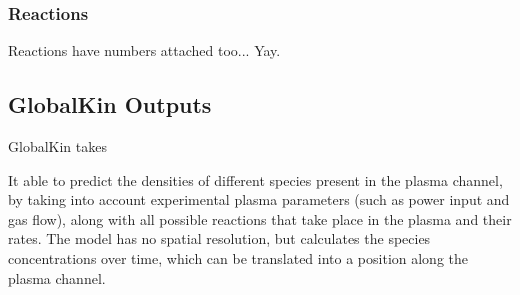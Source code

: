 \documentclass[11pt, oneside]{article}   	%
\begin{document}
\subsubsection{Reactions}
Reactions have numbers attached too... Yay.

\subsection{GlobalKin Outputs}
GlobalKin takes 


It able to predict the densities of different species present in the plasma channel, by taking into account experimental plasma parameters (such as power input and gas flow), along with all possible reactions that take place in the plasma and their rates.
The model has no spatial resolution, but calculates the species concentrations over time, which can be translated into a position along the plasma channel.
\end{document}
